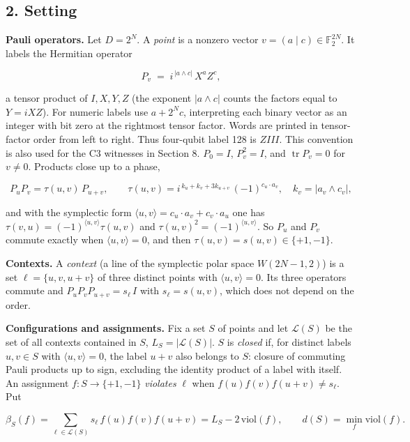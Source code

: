 \documentclass[11pt,a4paper]{article}
\begin{document}
\subsection{2. Setting}\label{2-setting}

\textbf{Pauli operators.} Let \(D = 2^N\). A \emph{point} is a nonzero vector \(v = (a \mid c) \in \mathbb{F}_2^{2N}\).
It labels the Hermitian operator

\[P_v \;=\; i^{\,|a \wedge c|}\, X^{a} Z^{c},\]

a tensor product of \(I, X, Y, Z\) (the exponent \(|a \wedge c|\) counts the factors equal to \(Y = iXZ\)).
For numeric labels use \(a+2^Nc\), interpreting each binary vector as an integer with bit zero at the
rightmost tensor factor. Words are printed in tensor-factor order from left to right. Thus four-qubit
label 128 is \(ZIII\). This convention is also used for the C3 witnesses in Section 8.
\(P_0 = I\), \(P_v^2 = I\), and \(\operatorname{tr} P_v = 0\) for \(v \ne 0\). Products close up to a phase,

\[P_u P_v = \tau(u,v)\, P_{u+v}, \qquad
\tau(u,v) = i^{\,k_u + k_v + 3 k_{u+v}}\,(-1)^{c_u \cdot a_v}, \quad k_v = |a_v \wedge c_v| ,\]

and with the symplectic form \(\langle u, v\rangle = c_u\cdot a_v + c_v \cdot a_u\) one has
\(\tau(v,u) = (-1)^{\langle u,v\rangle}\tau(u,v)\) and \(\tau(u,v)^2 = (-1)^{\langle u,v\rangle}\).
So \(P_u\) and \(P_v\) commute exactly when \(\langle u,v\rangle = 0\), and then \(\tau(u,v) = s(u,v) \in \{+1,-1\}\).

\textbf{Contexts.} A \emph{context} (a line of the symplectic polar space \(W(2N-1,2)\)) is a set
\(\ell = \{u, v, u+v\}\) of three distinct points with \(\langle u, v\rangle = 0\). Its three operators commute and
\(P_u P_v P_{u+v} = s_\ell\, I\) with \(s_\ell = s(u,v)\), which does not depend on the order.

\textbf{Configurations and assignments.} Fix a set \(S\) of points and let \(\mathcal{L}(S)\) be the set of all
contexts contained in \(S\), \(L_S = |\mathcal{L}(S)|\). \(S\) is \emph{closed} if, for distinct labels
\(u,v\in S\) with \(\langle u,v\rangle=0\), the label \(u+v\) also belongs to \(S\): closure of commuting
Pauli products up to sign, excluding the identity product of a label with itself.
An assignment \(f : S \to \{+1,-1\}\) \emph{violates}
\(\ell\) when \(f(u) f(v) f(u+v) \neq s_\ell\). Put

\[\beta_S(f) = \sum_{\ell \in \mathcal{L}(S)} s_\ell\, f(u) f(v) f(u+v) = L_S - 2\,\mathrm{viol}(f),
\qquad d(S) = \min_f \mathrm{viol}(f).\]
\end{document}

